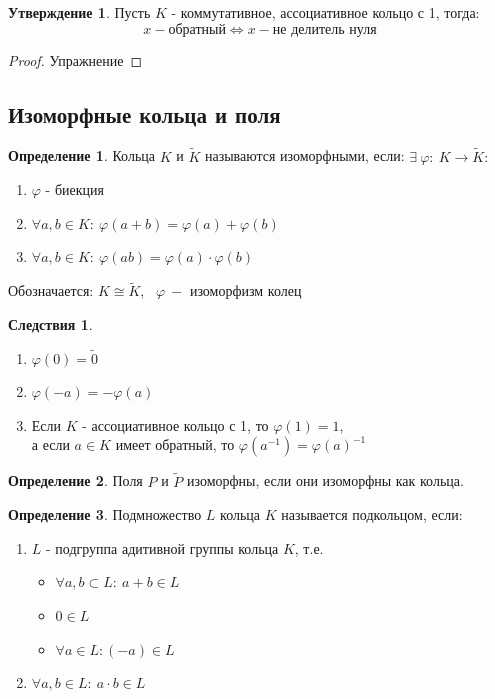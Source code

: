\documentclass[a4paper, 12pt]{article}
\renewcommand{\phi}{\varphi}
\newcommand\tab[1][.5cm]{\hspace*{#1}}
\theoremstyle{definition}
\newtheorem*{definition}{Определение}
\newtheorem*{consequenses}{Следствия}
\newtheorem*{subtheorem}{Утверждение}
\begin{document}
  \begin{subtheorem}
    Пусть $K$ - коммутативное, ассоциативное кольцо с 1, тогда: $$x - \text{обратный} \Longleftrightarrow x - \text{не делитель нуля}$$  
  \end{subtheorem} 
  \begin{proof}
    Упражнение
  \end{proof}
  \subsection{Изоморфные кольца и поля}
  \begin{definition}
    Кольца $K$ и $\widetilde{K}$ называются изоморфными, если: 
    $\exists \ \phi: \ K \to \widetilde{K}:$
    \begin{enumerate}
      \item $\phi$ - биекция
      \item $\forall a, b \in K: \ \phi(a+b) = \phi(a)+\phi(b)$
      \item $\forall a, b \in K: \ \phi(ab) = \phi(a)\cdot \phi(b)$ 
    \end{enumerate}
    Обозначается: $K\cong \widetilde{K}$, \ $\phi \ - $ изоморфизм колец 
  \end{definition} 
  \begin{consequenses}\tab
    \begin{enumerate}
      \item $\phi(0) = \widetilde{0}$
      \item $\phi(-a) = -\phi(a)$
      \item Если $K$ - ассоциативное кольцо с 1, то $\phi(1) = 1$, \\а если $a \in K$ имеет обратный, то $\phi(a^{-1}) = \phi(a)^{-1}$
    \end{enumerate}
  \end{consequenses} 
  \begin{definition}
    Поля $P$ и $\widetilde{P}$  изоморфны, если они изоморфны как кольца.
  \end{definition} 
  \begin{definition}
    Подмножество $L$ кольца $K$ называется подкольцом, если:
    \begin{enumerate}
      \item $L$ - подгруппа адитивной группы кольца $K$, т.е.
      \begin{itemize}
        \item $\forall a, b \subset L : \ a + b \in L$ 
        \item $0 \in L$ 
        \item $\forall a \in L: (-a) \in L$
      \end{itemize}
      \item $\forall a, b \in L: \ a \cdot b \in L$    
    \end{enumerate}
  \end{definition} 
\end{document}
